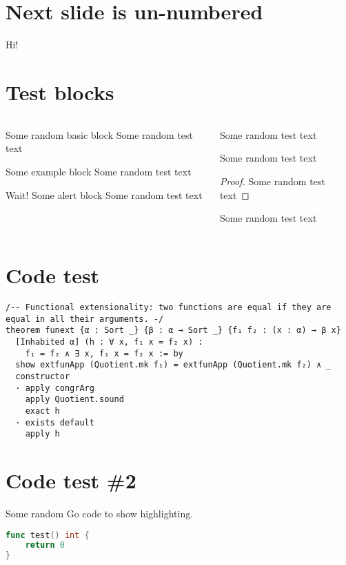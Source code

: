\documentclass[%
    listings={
        Lean=listings-lean,
        Go
    },
]{custom}
\begin{document}
\section{Next slide is un-numbered}
\begin{sframe*}
	Hi!
\end{sframe*}

\section{Test blocks}
\begin{sframe}
	\begin{columns}
		\begin{column}{.45\linewidth}
			\begin{block}{Some random basic block}
				Some random test text
			\end{block}
			\begin{exampleblock}{Some example block}
				Some random test text
			\end{exampleblock}
			\begin{alertblock}{Wait! Some alert block}
				Some random test text
			\end{alertblock}
		\end{column}
		\begin{column}{.45\linewidth}
			\begin{definition}
				Some random test text
			\end{definition}
			\begin{theorem}
				Some random test text
			\end{theorem}
			\begin{proof}
				Some random test text
			\end{proof}
			\begin{lemma}
				Some random test text
			\end{lemma}
		\end{column}
	\end{columns}
\end{sframe}

\section{Code test}
\begin{sframe}[fragile]
	\begin{lstlisting}[language=Lean]
/-- Functional extensionality: two functions are equal if they are equal in all their arguments. -/
theorem funext {α : Sort _} {β : α → Sort _} {f₁ f₂ : (x : α) → β x}
  [Inhabited α] (h : ∀ x, f₁ x = f₂ x) : 
    f₁ = f₂ ∧ ∃ x, f₁ x = f₂ x := by
  show extfunApp (Quotient.mk f₁) = extfunApp (Quotient.mk f₂) ∧ _
  constructor 
  · apply congrArg
    apply Quotient.sound
    exact h
  · exists default
    apply h
\end{lstlisting}
\end{sframe}

\section{Code test \#2}
\begin{sframe}[fragile]
	Some random Go code to show highlighting.

	\begin{lstlisting}[language=Go]
func test() int {
    return 0
}
\end{lstlisting}
\end{sframe}
\end{document}
